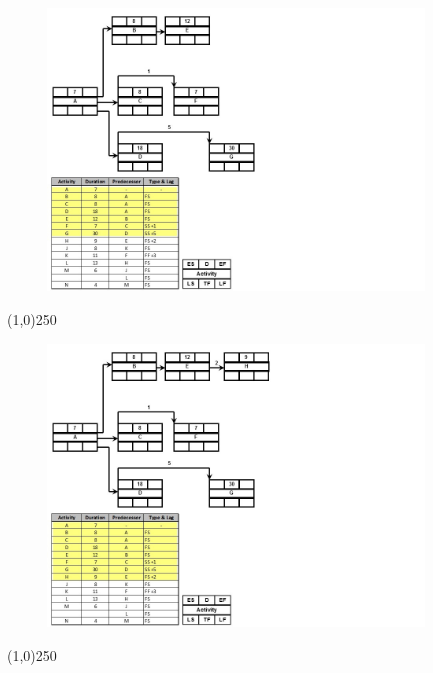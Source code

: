 \begin{frame}
\begin{figure}
	\centering
		\includegraphics[width = 10.0cm]{oldnotes/Slide194.jpg}
\end{figure}
\end{frame}
\begin{center}\line(1,0){250}\end{center}




\begin{frame}
\begin{figure}
	\centering
		\includegraphics[width = 10.0cm]{oldnotes/Slide195.jpg}
\end{figure}
\end{frame}
\begin{center}\line(1,0){250}\end{center}




